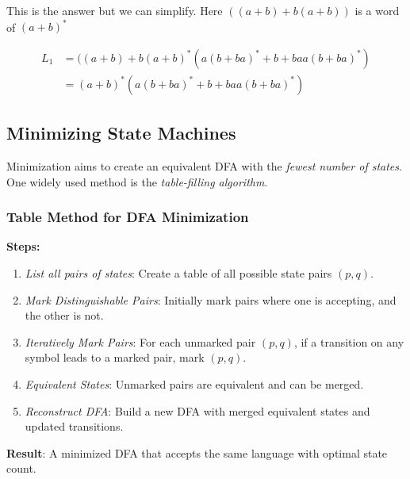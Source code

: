 This is the answer but we can simplify. Here \(((a+ b) + b(a+b))\) is a word of \((a+b)^*\)

\begin{align*}
    L_1 &= ((a+b)  + b(a + b)^*(a(b + ba)^* + b + baa(b + ba)^*) \\
        &= (a+b)^* (a(b + ba)^* + b + baa(b + ba)^*)
\end{align*}

\subsection{Minimizing State Machines}

Minimization aims to create an equivalent DFA with the \emph{fewest number of states}. One widely used 
method is the \emph{table-filling algorithm}.

\subsubsection{Table Method for DFA Minimization}

\textbf{Steps:}

\begin{enumerate}
    
    \item \emph{List all pairs of states}: Create a table of all possible state pairs \((p, q)\).

    \item \emph{Mark Distinguishable Pairs}: Initially mark pairs where one is accepting, and the other is not.

    \item \emph{Iteratively Mark Pairs}: For each unmarked pair \((p, q)\), if a transition on any symbol leads to a marked pair, mark \((p, q)\).

    \item \emph{Equivalent States}: Unmarked pairs are equivalent and can be merged.

    \item \emph{Reconstruct DFA}: Build a new DFA with merged equivalent states and updated transitions.

\end{enumerate}

\textbf{Result}: A minimized DFA that accepts the same language with optimal state count.

